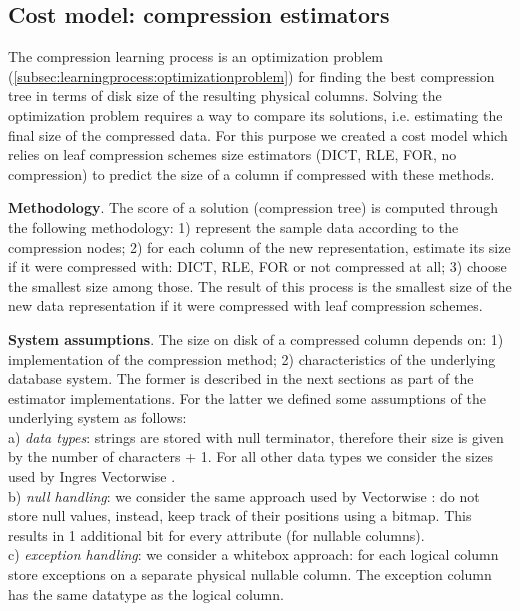 \subsection{Cost model: compression estimators}
\label{sub:estimators}




% 

The compression learning process is an optimization problem (\ref{subsec:learningprocess:optimizationproblem}) for finding the best compression tree in terms of disk size of the resulting physical columns. Solving the optimization problem requires a way to compare its solutions, i.e. estimating the final size of the compressed data. For this purpose we created a cost model which relies on leaf compression schemes size estimators (DICT, RLE, FOR, no compression) to predict the size of a column if compressed with these methods.

\textbf{Methodology}. The score of a solution (compression tree) is computed through the following methodology: 1) represent the sample data according to the compression nodes; 2) for each column of the new representation, estimate its size if it were compressed with: DICT, RLE, FOR or not compressed at all; 3) choose the smallest size among those. The result of this process is the smallest size of the new data representation if it were compressed with leaf compression schemes.

\textbf{System assumptions}. The size on disk of a compressed column depends on: 1) implementation of the compression method; 2) characteristics of the underlying database system. The former is described in the next sections as part of the estimator implementations. For the latter we defined some assumptions of the underlying system as follows:\\
a) \textit{data types}: strings are stored with null terminator, therefore their size is given by the number of characters + 1. For all other data types we consider the sizes used by Ingres Vectorwise \cite{zukowski2012vectorwise,actianingres}. \\
b) \textit{null handling}: we consider the same approach  used by Vectorwise \cite{zukowski2012vectorwise}: do not store null values, instead, keep track of their positions using a bitmap. This results in 1 additional bit for every attribute (for nullable columns).\\
c) \textit{exception handling}: we consider a whitebox approach: for each logical column store exceptions on a separate physical nullable column. The exception column has the same datatype as the logical column.

